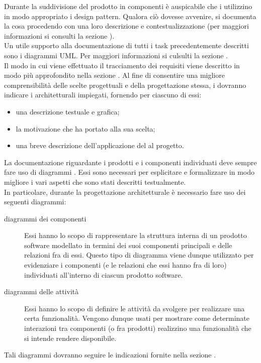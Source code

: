 			Durante la suddivisione del prodotto in componenti è auspicabile che i  utilizzino in modo appropriato i design pattern. Qualora ciò dovesse avvenire, si documenta la cosa procedendo con una loro descrizione e contestualizzazione (per maggiori informazioni si consulti la sezione ).\\
			Un utile supporto alla documentazione di tutti i task precedentemente descritti sono i diagrammi UML. Per maggiori informazioni si culsulti la sezione .\\
			Il modo in cui viene effettuato il tracciamento dei requisiti viene descritto in modo più approfondito nella sezione .
				 \label{sec:ProgArcDesingPattern}
					Al fine di consentire una migliore comprensibilità delle scelte progettuali e della progettazione stessa, i  dovranno indicare i  architetturali impiegati, fornendo per ciascuno di essi:
					\begin{itemize}
						\item una descrizione testuale e grafica;
						\item la motivazione che ha portato alla sua scelta;
						\item una breve descrizione dell'applicazione del  al progetto.
					\end{itemize}
				 \label{sec:ProgArcUML}
					La documentazione riguardante i prodotti e i componenti individuati deve sempre fare uso di diagrammi . Essi sono necessari per esplicitare e formalizzare in modo migliore i vari aspetti che sono stati descritti testualmente.\\
					In particolare, durante la progettazione architetturale è necessario fare uso dei seguenti diagrammi:
					\begin{description}
						\item[diagrammi dei componenti] Essi hanno lo scopo di rappresentare la struttura interna di un prodotto software modellato in termini dei suoi componenti principali e delle relazioni fra di essi. Questo tipo di diagramma viene dunque utilizzato per evidenziare i componenti (e le relazioni che essi hanno fra di loro) individuati all'interno di ciascun prodotto software.
						\item[diagrammi delle attività] Essi hanno lo scopo di definire le attività da svolgere per realizzare una certa funzionalità. Vengono dunque usati per mostrare come determinate interazioni tra componenti (o fra prodotti) realizzino una funzionalità che si intende rendere disponibile.
					\end{description}
					Tali diagrammi dovranno seguire le indicazioni fornite nella sezione .

